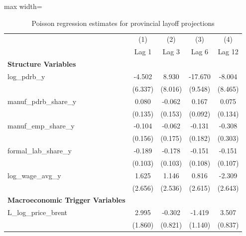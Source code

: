 \begin{table}[H]\centering
\caption{Poisson regression estimates for provincial layoff projections}
\small
\renewcommand{\arraystretch}{1.15}
\begin{adjustbox}{max width=\textwidth}
\begin{tabular}{l*{4}{c}}
\toprule
& (1) & (2) & (3) & (4) \\ & Lag 1 & Lag 3 & Lag 6 & Lag 12 \\ \midrule
\addlinespace\textbf{Structure Variables}&                     &                     &                     &                     \\
log\_pdrb\_y  &      -4.502         &       8.930         &     -17.670         &      -8.004         \\
            &     (6.337)         &     (8.016)         &     (9.548)         &     (8.465)         \\
manuf\_pdrb\_share\_y&       0.080         &      -0.062         &       0.167         &       0.075         \\
            &     (0.135)         &     (0.153)         &     (0.092)         &     (0.134)         \\
manuf\_emp\_share\_y&      -0.104         &      -0.062         &      -0.131         &      -0.308         \\
            &     (0.156)         &     (0.175)         &     (0.182)         &     (0.303)         \\
formal\_lab\_share\_y&      -0.189         &      -0.178         &      -0.151         &      -0.151         \\
            &     (0.103)         &     (0.103)         &     (0.108)         &     (0.107)         \\
log\_wage\_avg\_y&       1.625         &       1.146         &       0.816         &      -2.309         \\
            &     (2.656)         &     (2.536)         &     (2.615)         &     (2.643)         \\
\addlinespace\textbf{Macroeconomic Trigger Variables}&                     &                     &                     &                     \\
L\_log\_price\_brent&       2.995         &      -0.302         &      -1.419         &       3.507\sym{***}\\
            &     (1.860)         &     (0.821)         &     (1.140)         &     (0.837)         \\

\end{tabular}
\end{adjustbox}
\end{table}

